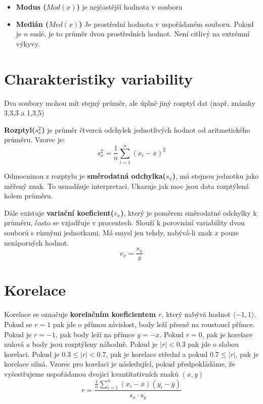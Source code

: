 \documentclass[12pt]{article}
\begin{document}
\begin{itemize}[itemsep = 2pt]
    Kdyby nebyla vzdálenost stejná, ale auto by jelo $80$ km/h 2 hodiny a $48$ km/h jen jednu hodinu, dosazená by vypadalo následovně:
    \[\overline{x_h} = \frac{3}{\frac{2}{80} + \frac{1}{48}} \doteq 65,5 km/h\]
    Toto je vážená varianta harmonického průměru.

    
    \item \textbf{Modus ($Mod(x)$)} je nejčastější hodnota v souboru
    \item \textbf{Medián ($Med(x)$)} Je prostřední hodnota v uspořádaném souboru. Pokud je $n$ sudé, je to průměr dvou prostředních hodnot. Není citlivý na extrémní výkyvy.
    
\end{itemize}

\section*{Charakteristiky variability}
Dva soubory mohou mít stejný průměr, ale úplně jiný rozptyl dat (např. známky 3,3,3 a 1,3,5)

\textbf{Rozptyl($s_x^2$)} je průměr čtverců odchylek jednotlivých hodnot od aritmetického průměru. Vzorec je:
\[s_x^2 = \frac{1}{n}\sum_{i=1}^{n}(x_i - \overline{x})^2\]

Odmocninou z rozptylu je \textbf{směrodatná odchylka($s_x$)}, má stejnou jednotku jako měřený znak. To usnadňuje interpretaci. Ukazuje jak moc jsou data rozptýlená kolem průměru.

Dále existuje \textbf{variační koeficient($v_x$)}, který je poměrem směrodatné odchylky k průměru, často se vzjadřuje v procentech. Slouží k porovnání variability dvou souborů s různými jednotkami. Má smysl jen tehdy, nabývá-li znak $x$ pouze nezáporných hodnot.
\[v_x = \frac{s_x}{\overline{x}}\]

\section*{Korelace}
Korelace se označuje \textbf{korelačním koeficientem $r$}, který nabývá hodnot $\langle -1,1 \rangle$. Pokud se $r = 1$ pak jde o přímou závislost, body leží přesně na roustoucí přímce. Pokud je $r = -1$, pak body leží na přímce $y = -x$. Pokud $r = 0$, pak je korelace nulová a body jsou rozptýleny náhodně.
Pokud je $|r| < 0.3$ pak jde o slabou korelaci. Pokud je $0.3 \leq |r| < 0.7$, pak je korelace střední a  pokud $0.7 \leq |r|$, pak je korelace silná. Vzorec pro korelaci je následující, pokud předpokládáme, že vyšestřujeme uspořádanou dvojici kvantitativních znaků $(x,y)$
\[r = \frac{\frac{1}{n}\sum_{i=1}^{n}(x_i - \overline{x})(y_i - \overline{y})}{s_x \cdot s_y}\]
\end{document}
